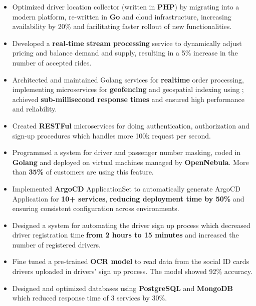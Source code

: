 \vspace{0.5cm}

\begin{itemize}
      \item Optimized driver location collector (written in \textbf{PHP}) by migrating into a modern platform, re-written in \textbf{Go} and cloud infrastructure,
            increasing availability by 20\% and facilitating faster rollout of new functionalities.
      \item Developed a \textbf{real-time stream processing} service to dynamically adjust pricing and balance demand and supply,
            resulting in a 5\% increase in the number of accepted rides.
      \item Architected and maintained Golang services for \textbf{realtime} order processing, implementing microservices for \textbf{geofencing} and geospatial indexing using ; achieved \textbf{sub-millisecond response times} and ensured high performance and reliability.
      \item Created \textbf{RESTFul} microservices for doing authentication, authorization and sign-up procedures which handles more 100k request per second.
      \item Programmed a system for driver and passenger number masking, coded in \textbf{Golang}
            and deployed on virtual machines managed by \textbf{OpenNebula}. More than \textbf{35\%} of customers are using this feature.
      \item Implemented \textbf{ArgoCD} ApplicationSet to automatically generate ArgoCD Application for \textbf{10+ services}, \textbf{reducing deployment time by 50\%} and ensuring consistent configuration across environments.
      \item Designed a system for automating the driver sign up process which decreased driver registration time \textbf{from 2 hours to 15 minutes} and increased the number of registered drivers.
      \item Fine tuned a pre-trained \textbf{OCR model} to read data from the social ID cards drivers uploaded in drivers' sign up process. The model showed 92\% accuracy.
      \item Designed and optimized databases using \textbf{PostgreSQL} and \textbf{MongoDB} which reduced response time of 3 services by 30\%.
\end{itemize}

\vspace{0.5cm}

